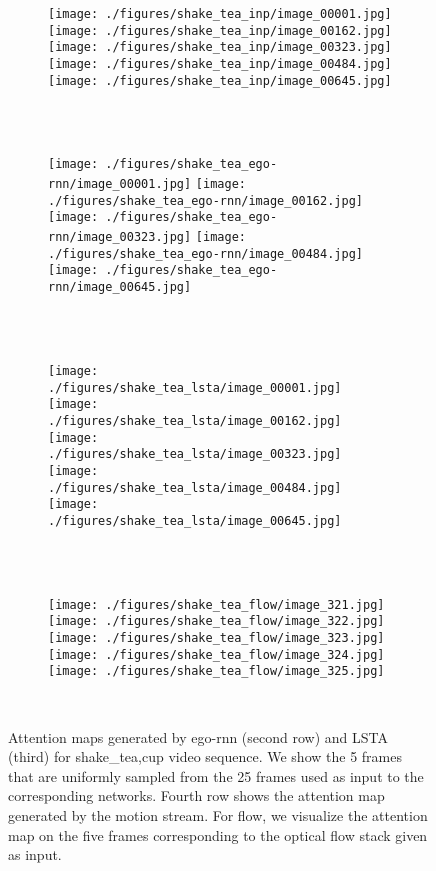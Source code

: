 \documentclass[10pt,twocolumn,letterpaper]{article}
\begin{document}
\begin{figure*}[t]
	\centering      
	\begin{subfigure}[b]{0.95\textwidth}
		\texttt{[image: ./figures/shake\_tea\_inp/image\_00001.jpg]}
		\texttt{[image: ./figures/shake\_tea\_inp/image\_00162.jpg]}
		\texttt{[image: ./figures/shake\_tea\_inp/image\_00323.jpg]}
		\texttt{[image: ./figures/shake\_tea\_inp/image\_00484.jpg]}
		\texttt{[image: ./figures/shake\_tea\_inp/image\_00645.jpg]}
	\end{subfigure}\\ \vskip 2mm
	\ 
	\begin{subfigure}[b]{0.95\textwidth}
		\texttt{[image: ./figures/shake\_tea\_ego-rnn/image\_00001.jpg]}
		\texttt{[image: ./figures/shake\_tea\_ego-rnn/image\_00162.jpg]}
		\texttt{[image: ./figures/shake\_tea\_ego-rnn/image\_00323.jpg]}
		\texttt{[image: ./figures/shake\_tea\_ego-rnn/image\_00484.jpg]}
		\texttt{[image: ./figures/shake\_tea\_ego-rnn/image\_00645.jpg]}
	\end{subfigure}\\ \vskip 2mm
	\ 
	\begin{subfigure}[b]{0.95\textwidth}
		\texttt{[image: ./figures/shake\_tea\_lsta/image\_00001.jpg]}
		\texttt{[image: ./figures/shake\_tea\_lsta/image\_00162.jpg]}
		\texttt{[image: ./figures/shake\_tea\_lsta/image\_00323.jpg]}
		\texttt{[image: ./figures/shake\_tea\_lsta/image\_00484.jpg]}
		\texttt{[image: ./figures/shake\_tea\_lsta/image\_00645.jpg]}
	\end{subfigure}\\ \vskip 2mm	       
	\ 
	\begin{subfigure}[b]{0.95\textwidth}
		\texttt{[image: ./figures/shake\_tea\_flow/image\_321.jpg]}
		\texttt{[image: ./figures/shake\_tea\_flow/image\_322.jpg]}
		\texttt{[image: ./figures/shake\_tea\_flow/image\_323.jpg]}
		\texttt{[image: ./figures/shake\_tea\_flow/image\_324.jpg]}
		\texttt{[image: ./figures/shake\_tea\_flow/image\_325.jpg]}
	\end{subfigure}\\ \vskip 2mm			 
	\caption{Attention maps generated by ego-rnn (second row) and LSTA (third) for shake\_tea,cup video sequence. We show the 5 frames that are uniformly sampled from the 25 frames used as input to the corresponding networks. Fourth row shows the attention map generated by the motion stream. For flow, we visualize the attention map on the five frames corresponding to the optical flow stack given as input.}
	\label{fig:att_map_shake_tea}
\end{figure*}	
\end{document}
